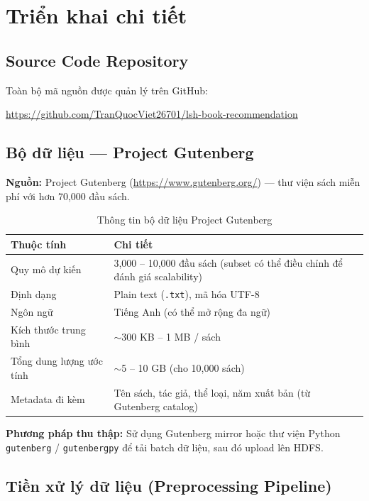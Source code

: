 \newpage
\section{Triển khai chi tiết}
\label{sec:implementation}

\subsection{Source Code Repository}
 
Toàn bộ mã nguồn được quản lý trên GitHub:
 
\begin{center}
\url{https://github.com/TranQuocViet26701/lsh-book-recommendation}
\end{center}

\subsection{Bộ dữ liệu --- Project Gutenberg}

\textbf{Nguồn:} Project Gutenberg (\url{https://www.gutenberg.org/}) --- thư viện sách miễn phí với hơn 70,000 đầu sách.

\begin{table}[h!]
\centering
\caption{Thông tin bộ dữ liệu Project Gutenberg}
\label{tab:dataset}
\begin{tabularx}{\textwidth}{|l|X|}
\hline
\textbf{Thuộc tính} & \textbf{Chi tiết} \\
\hline
Quy mô dự kiến & 3,000 -- 10,000 đầu sách (subset có thể điều chỉnh để đánh giá scalability) \\
\hline
Định dạng & Plain text (\texttt{.txt}), mã hóa UTF-8 \\
\hline
Ngôn ngữ & Tiếng Anh (có thể mở rộng đa ngữ) \\
\hline
Kích thước trung bình & $\sim$300 KB -- 1 MB / sách \\
\hline
Tổng dung lượng ước tính & $\sim$5 -- 10 GB (cho 10,000 sách) \\
\hline
Metadata đi kèm & Tên sách, tác giả, thể loại, năm xuất bản (từ Gutenberg catalog) \\
\hline
\end{tabularx}
\end{table}

\textbf{Phương pháp thu thập:} Sử dụng Gutenberg mirror hoặc thư viện Python \texttt{gutenberg} / \texttt{gutenbergpy} để tải batch dữ liệu, sau đó upload lên HDFS.

\subsection{Tiền xử lý dữ liệu (Preprocessing Pipeline)}

